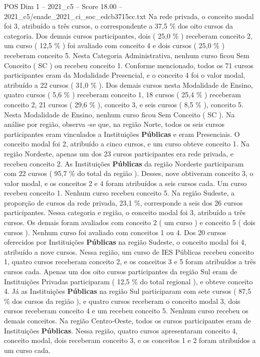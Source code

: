 \begin{textsample}{POS Dim 1 – 2021\_c5 – Score 18.00 – 2021\_c5/enade\_2021\_ci\_soc\_edcb3715cc.txt}
Na rede privada, o conceito modal foi 3, atribuído a três cursos, o correspondente a 37,5 \% dos oito cursos da categoria.
Dos demais cursos participantes, dois ( 25,0 \% ) receberam conceito 2, um curso ( 12,5 \% ) foi avaliado com conceito 4 e dois cursos ( 25,0 \% ) receberam conceito 5.
Nesta Categoria Administrativa, nenhum curso ficou Sem Conceito ( SC ) ou recebeu conceito 1.
Conforme mencionado, todos os 71 cursos participantes eram da Modalidade Presencial, e o conceito 4 foi o valor modal, atribuído a 22 cursos ( 31,0 \% ).
Dos demais cursos nesta Modalidade de Ensino, quatro cursos ( 5,6 \% ) receberam conceito 1, 18 cursos ( 25,4 \% ) receberam conceito 2, 21 cursos ( 29,6 \% ), conceito 3, e seis cursos ( 8,5 \% ), conceito 5.
Nesta Modalidade de Ensino, nenhum curso ficou Sem Conceito ( SC ).
Na análise por região, observa -se que, na região Norte, todos os seis cursos participantes eram vinculados a Instituições \textbf{Públicas} e eram Presenciais.
O conceito modal foi 2, atribuído a cinco cursos, e um curso obteve conceito 1.
Na região Nordeste, apenas um dos 23 cursos participantes era rede privada, e recebeu conceito 2.
As Instituições \textbf{Públicas} da região Nordeste participaram com 22 cursos ( 95,7 \% do total da região ).
Desses, nove obtiveram conceito 3, o valor modal, e os conceitos 2 e 4 foram atribuídos a seis cursos cada.
Um curso recebeu conceito 1.
Nenhum curso recebeu conceito 5.
Na região Sudeste, a proporção de cursos da rede privada, 23,1 \%, corresponde a seis dos 26 cursos participantes.
Nessa categoria e região, o conceito modal foi 3, atribuído a três cursos.
Os demais foram avaliados com conceito 2 ( um curso ) e conceito 5 ( dois cursos ).
Nenhum curso foi avaliado com conceitos 1 ou 4.
Dos 20 cursos oferecidos por Instituições \textbf{Públicas} na região Sudeste, o conceito modal foi 4, atribuído a nove cursos.
Nessa região, um curso de IES Públicas recebeu conceito 1, quatro cursos receberam conceito 2, e os conceitos 3 e 5 foram atribuídos a três cursos cada.
Apenas um dos oito cursos participantes da região Sul eram de Instituições Privadas participaram ( 12,5 \% do total regional ), e obteve conceito 4.
Já as Instituições \textbf{Públicas} na região Sul participaram com sete cursos ( 87,5 \% dos cursos da região ), e quatro cursos receberam o conceito modal 3, dois cursos receberam conceito 4 e um recebeu conceito 5.
Nenhum curso recebeu os demais conceitos.
Na região Centro-Oeste, todos os cursos participantes eram de Instituições \textbf{Públicas}.
Nessa região, quatro cursos apresentaram conceito 4, conceito modal, dois receberam conceito 3, e os conceitos 1 e 2 foram atribuídos a um curso cada.

\end{textsample}
